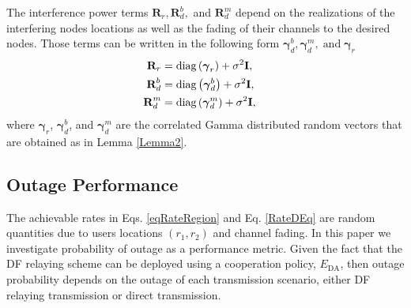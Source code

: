 \documentclass[12pt, draftclsnofoot, onecolumn]{IEEEtran}
\theoremstyle{plain}
\begin{document}
The interference power terms $\textbf{R}_{r}, \textbf{R}_{d}^b,$ and $\textbf{R}_{d}^m$ 
depend on the realizations of the interfering nodes locations as well as the fading of their channels to the desired nodes. Those terms can be written in the following form
$\boldsymbol{\gamma}_{d}^b, \boldsymbol{\gamma}_{d}^m,\;\text{and} \; \boldsymbol{\gamma}_{r}$
\begin{align}
\textbf{R}_{r}&=\text{diag}\left(\boldsymbol{\gamma}_{r} \right)+\sigma^2 \mathbf{I},&&\notag\\
%
\textbf{R}_{d}^b&=\text{diag}\left(\boldsymbol{\gamma}_{d}^b \right)+\sigma^2 \mathbf{I},&&\notag\\
%
\textbf{R}_{d}^m&=\text{diag}\left(\boldsymbol{\gamma}_{d}^m \right)+\sigma^2 \mathbf{I},&&
%
\end{align}
where $\boldsymbol{\gamma}_{r}$, $\boldsymbol{\gamma}_{d}^b$, and $\boldsymbol{\gamma}_{d}^m$ are the correlated Gamma distributed random vectors that are obtained as in Lemma \ref{Lemma2}.

\subsection{Outage Performance}
The achievable rates in Eqs. \eqref{eqRateRegion} and Eq. \eqref{RateDEq} are  random quantities due to users locations $(r_1, r_2)$ and channel fading. 
%
In this paper we investigate probability of outage as a performance metric. 
Given the fact that the DF relaying scheme can be deployed using a cooperation policy, $E_{\text{DA}}$, 
then outage probability depends on the outage of each transmission scenario, either DF relaying transmission or direct transmission. 
\end{document}
